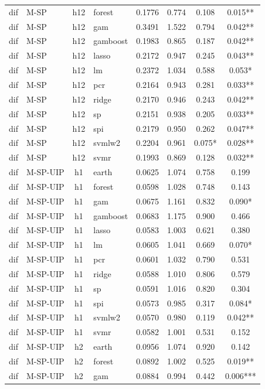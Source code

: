 \begin{ThreePartTable}
\begin{longtable}[t]{llclcccc}
dif & M-SP & h12 & forest & 0.1776 & 0.774 & 0.108 & 0.015**\\
dif & M-SP & h12 & gam & 0.3491 & 1.522 & 0.794 & 0.042**\\
dif & M-SP & h12 & gamboost & 0.1983 & 0.865 & 0.187 & 0.042**\\
dif & M-SP & h12 & lasso & 0.2172 & 0.947 & 0.245 & 0.043**\\
dif & M-SP & h12 & lm & 0.2372 & 1.034 & 0.588 & 0.053*\\
dif & M-SP & h12 & pcr & 0.2164 & 0.943 & 0.281 & 0.033**\\
dif & M-SP & h12 & ridge & 0.2170 & 0.946 & 0.243 & 0.042**\\
dif & M-SP & h12 & sp & 0.2151 & 0.938 & 0.205 & 0.033**\\
dif & M-SP & h12 & spi & 0.2179 & 0.950 & 0.262 & 0.047**\\
dif & M-SP & h12 & svmlw2 & 0.2204 & 0.961 & 0.075* & 0.028**\\
dif & M-SP & h12 & svmr & 0.1993 & 0.869 & 0.128 & 0.032**\\
\addlinespace
dif & M-SP-UIP & h1 & earth & 0.0625 & 1.074 & 0.758 & 0.199\\
dif & M-SP-UIP & h1 & forest & 0.0598 & 1.028 & 0.748 & 0.143\\
dif & M-SP-UIP & h1 & gam & 0.0675 & 1.161 & 0.832 & 0.090*\\
dif & M-SP-UIP & h1 & gamboost & 0.0683 & 1.175 & 0.900 & 0.466\\
dif & M-SP-UIP & h1 & lasso & 0.0583 & 1.003 & 0.621 & 0.380\\
dif & M-SP-UIP & h1 & lm & 0.0605 & 1.041 & 0.669 & 0.070*\\
dif & M-SP-UIP & h1 & pcr & 0.0601 & 1.032 & 0.790 & 0.531\\
dif & M-SP-UIP & h1 & ridge & 0.0588 & 1.010 & 0.806 & 0.579\\
dif & M-SP-UIP & h1 & sp & 0.0591 & 1.016 & 0.820 & 0.304\\
dif & M-SP-UIP & h1 & spi & 0.0573 & 0.985 & 0.317 & 0.084*\\
dif & M-SP-UIP & h1 & svmlw2 & 0.0570 & 0.980 & 0.119 & 0.042**\\
dif & M-SP-UIP & h1 & svmr & 0.0582 & 1.001 & 0.531 & 0.152\\
\addlinespace
dif & M-SP-UIP & h2 & earth & 0.0956 & 1.074 & 0.920 & 0.142\\
dif & M-SP-UIP & h2 & forest & 0.0892 & 1.002 & 0.525 & 0.019**\\
dif & M-SP-UIP & h2 & gam & 0.0884 & 0.994 & 0.442 & 0.006***\\

\end{longtable}
\end{ThreePartTable}
